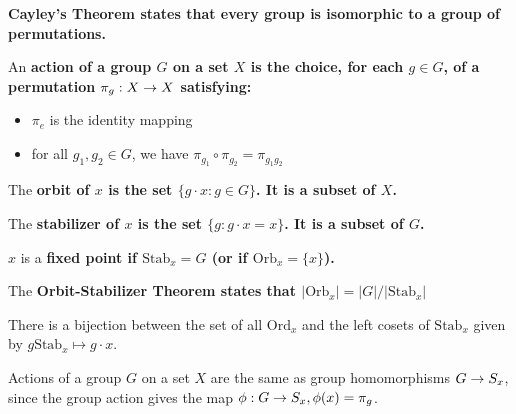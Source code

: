 \documentclass{hmwk}
\begin{document}
\begin{important}
\bf{Cayley's Theorem} states that every group is isomorphic to a group of permutations.
\end{important}

\begin{defn}
An \bf{action} of a group $G$ on a set $X$ is the choice, for each $g \in G$, of a permutation $\pi_g: X \rightarrow X$ satisfying:
\begin{itemize}
    \item $\pi_e$ is the identity mapping
    \item for all $g_1, g_2 \in G$, we have $\pi_{g_1} \circ \pi_{g_2} = \pi_{g_1g_2}$
\end{itemize}
\end{defn}

\begin{defn}
The \bf{orbit} of $x$ is the set $\{g \cdot x : g \in G\}$. It is a subset of $X$.
\end{defn}

\begin{defn}
The \bf{stabilizer} of $x$ is the set $\{g : g\cdot x = x\}$. It is a subset of $G$.
\end{defn}

\begin{defn}
$x$ is a \bf{fixed point} if $\text{Stab}_x = G$ (or if $\text{Orb}_x = \{x\}$). 
\end{defn}

\begin{important}
The \bf{Orbit-Stabilizer Theorem} states that $|\text{Orb}_x| = |G|/|\text{Stab}_x|$
\end{important}

\begin{prop}
There is a bijection between the set of all $\text{Ord}_x$ and the left cosets of $\text{Stab}_x$ given by $g\text{Stab}_x \mapsto g\cdot x$.
\end{prop}

\begin{prop}
Actions of a group $G$ on a set $X$ are the same as group homomorphisms $G \rightarrow S_x$, since the group action gives the map $\phi: G \rightarrow S_x, \phi(x) = \pi_g$.
\end{prop}
\end{document}

